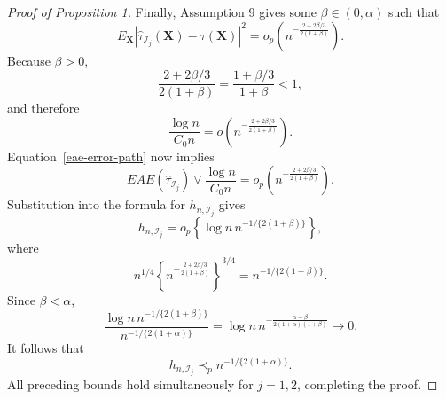 \documentclass[11pt]{article}
\theoremstyle{referenceplain}
\theoremstyle{referencedefinition}
\theoremstyle{referenceremark}
\begin{document}
\begin{proof}[Proof of Proposition 1]
Finally, Assumption 9 gives some $\beta\in(0,\alpha)$ such that
\[
E_{\mathbf X}
|\widehat\tau_{\mathcal I_j}(\mathbf X)-\tau(\mathbf X)|^2
=
o_p\left(
n^{-\frac{2+2\beta/3}{2(1+\beta)}}
\right).
\]
Because $\beta>0$,
\[
\frac{2+2\beta/3}{2(1+\beta)}
=
\frac{1+\beta/3}{1+\beta}
<1,
\]
and therefore
\[
\frac{\log n}{{C_0}n}
=
o\left(
n^{-\frac{2+2\beta/3}{2(1+\beta)}}
\right).
\]
Equation~\eqref{eae-error-path} now implies
\[
EAE(\widehat\tau_{\mathcal I_j})
\vee\frac{\log n}{{C_0}n}
=
o_p\left(
n^{-\frac{2+2\beta/3}{2(1+\beta)}}
\right).
\]
Substitution into the formula for $h_{n,\mathcal I_j}$ gives
\[
h_{n,\mathcal I_j}
=
o_p\left\{
\log n\,n^{-1/\{2(1+\beta)\}}
\right\},
\]
where
\[
n^{1/4}
\left\{
n^{-\frac{2+2\beta/3}{2(1+\beta)}}
\right\}^{3/4}
=
n^{-1/\{2(1+\beta)\}}.
\]
Since $\beta<\alpha$,
\[
\frac{
\log n\,n^{-1/\{2(1+\beta)\}}
}{
n^{-1/\{2(1+\alpha)\}}
}
=
\log n\,
n^{-\frac{\alpha-\beta}
{2(1+\alpha)(1+\beta)}}
\longrightarrow0.
\]
It follows that
\[
h_{n,\mathcal I_j}
\prec_p
n^{-1/\{2(1+\alpha)\}}.
\]
All preceding bounds hold simultaneously for $j=1,2$, completing the
proof.
\end{proof}
\end{document}
